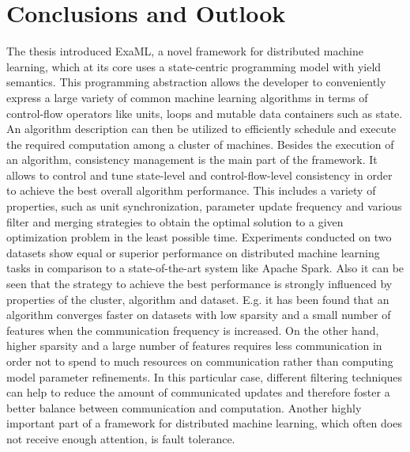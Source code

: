 
\chapter{Conclusions and Outlook}
\label{c:conclusion}
The thesis introduced ExaML, a novel framework for distributed machine learning, which at its core uses a state-centric programming model with yield semantics.
This programming abstraction allows the developer to conveniently express a large variety of common machine learning algorithms in terms of control-flow operators like units, loops and mutable data containers such as state.
An algorithm description can then be utilized to efficiently schedule and execute the required computation among a cluster of machines.
Besides the execution of an algorithm, consistency management is the main part of the framework.
It allows to control and tune state-level and control-flow-level consistency in order to achieve the best overall algorithm performance.
This includes a variety of properties, such as unit synchronization, parameter update frequency and various filter and merging strategies to obtain the optimal solution to a given optimization problem in the least possible time.
Experiments conducted on two datasets show equal or superior performance on distributed machine learning tasks in comparison to a state-of-the-art system like Apache Spark.
Also it can be seen that the strategy to achieve the best performance is strongly influenced by properties of the cluster, algorithm and dataset.
E.g. it has been found that an algorithm converges faster on datasets with low sparsity and a small number of features when the communication frequency is increased.
On the other hand, higher sparsity and a large number of features requires less communication in order not to spend to much resources on communication rather than computing model parameter refinements.
In this particular case, different filtering techniques can help to reduce the amount of communicated updates and therefore foster a better balance between communication and computation.
Another highly important part of a framework for distributed machine learning, which often does not receive enough attention, is fault tolerance.

